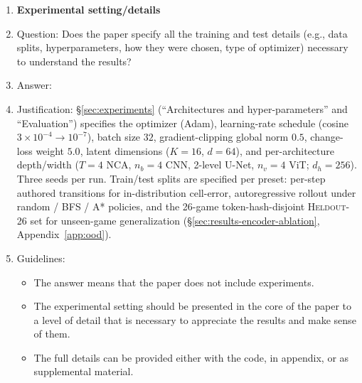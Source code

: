 \begin{enumerate}
\item {\bf Experimental setting/details}
    \item[] Question: Does the paper specify all the training and test details (e.g., data splits, hyperparameters, how they were chosen, type of optimizer) necessary to understand the results?
    \item[] Answer: \answerYes{}
    \item[] Justification: \S\ref{sec:experiments} (``Architectures and hyper-parameters'' and ``Evaluation'') specifies the optimizer (Adam), learning-rate schedule (cosine $3 \times 10^{-4} \to 10^{-7}$), batch size $32$, gradient-clipping global norm $0.5$, change-loss weight $5.0$, latent dimensions ($K{=}16$, $d{=}64$), and per-architecture depth/width ($T{=}4$ NCA, $n_b{=}4$ CNN, 2-level U-Net, $n_v{=}4$ ViT; $d_h{=}256$). Three seeds per run. Train/test splits are specified per preset: per-step authored transitions for in-distribution cell-error, autoregressive rollout under random / BFS / A* policies, and the 26-game token-hash-disjoint \textsc{Heldout-26} set for unseen-game generalization (\S\ref{sec:results-encoder-ablation}, Appendix~\ref{app:ood}).
    \item[] Guidelines:
    \begin{itemize}
        \item The answer \answerNA{} means that the paper does not include experiments.
        \item The experimental setting should be presented in the core of the paper to a level of detail that is necessary to appreciate the results and make sense of them.
        \item The full details can be provided either with the code, in appendix, or as supplemental material.
    \end{itemize}


\end{enumerate}
